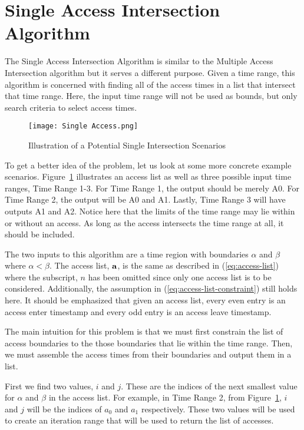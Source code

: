 
\section{Single Access Intersection Algorithm} \label{alg:contains}

The Single Access Intersection Algorithm is similar to the Multiple Access
Intersection algorithm but it serves a different purpose. Given a time range,
this algorithm is concerned with finding all of the access times in a list that
intersect that time range. Here, the input time range will not be used as
bounds, but only search criteria to select access times. 

\begin{figure}[h]
    \centering
    \texttt{[image: Single Access.png]} 
    \caption{Illustration of a Potential Single Intersection Scenarios}
    \label{fig:single-access-intersect}
\end{figure}

To get a better idea of the problem, let us look at some more concrete example
scenarios. Figure~\ref{fig:single-access-intersect} illustrates an access list
as well as three possible input time ranges, Time Range 1-3. For Time Range 1,
the output should be merely A0. For Time Range 2, the output will be A0 and A1.
Lastly, Time Range 3 will have outputs A1 and A2. Notice here that the limits
of the time range may lie within or without an access. As long as the access
intersects the time range at all, it should be included.

The two inputs to this algorithm are a time region with boundaries $\alpha$ and
$\beta$ where $\alpha < \beta$. The access list, $\bm{\mathrm{a}}$, is the same as
described in (\ref{eq:access-list}) where the subscript, $n$ has been omitted
since only one access list is to be considered. Additionally, the assumption in
(\ref{eq:access-list-constraint}) still holds here. It should be emphasized
that given an access list, every even entry is an access enter timestamp and
every odd entry is an access leave timestamp.

The main intuition for this problem is that we must first constrain the list of
access boundaries to the those boundaries that lie within the time range.
Then, we must assemble the access times from their boundaries and output them
in a list.  

First we find two values, $i$ and $j$.  These are the indices of the next
smallest value for $\alpha$ and $\beta$ in the access list.  For example, in
Time Range 2, from Figure~\ref{fig:single-access-intersect}, $i$ and $j$ will
be the indices of $a_0$ and $a_1$ respectively. These two values will be used
to create an iteration range that will be used to return the list of accesses. 

